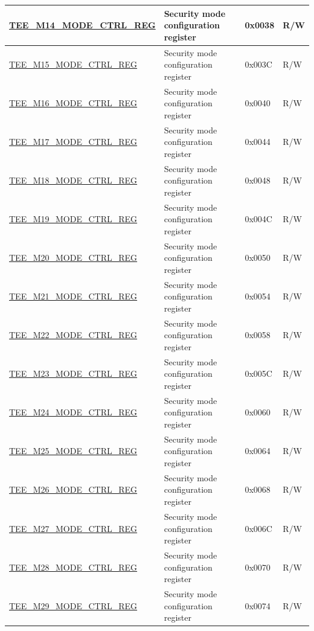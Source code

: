 \begin{longtable}{ | L{6.5cm} | L{6cm} | l | l | }
\hyperref[regdesc:TEEMNMODECTRLREG]{TEE\_M14\_MODE\_CTRL\_REG} & Security mode configuration register & 0x0038 & R/W \\ \hline
\hyperref[regdesc:TEEMNMODECTRLREG]{TEE\_M15\_MODE\_CTRL\_REG} & Security mode configuration register & 0x003C & R/W \\ \hline
\hyperref[regdesc:TEEMNMODECTRLREG]{TEE\_M16\_MODE\_CTRL\_REG} & Security mode configuration register & 0x0040 & R/W \\ \hline
\hyperref[regdesc:TEEMNMODECTRLREG]{TEE\_M17\_MODE\_CTRL\_REG} & Security mode configuration register & 0x0044 & R/W \\ \hline
\hyperref[regdesc:TEEMNMODECTRLREG]{TEE\_M18\_MODE\_CTRL\_REG} & Security mode configuration register & 0x0048 & R/W \\ \hline
\hyperref[regdesc:TEEMNMODECTRLREG]{TEE\_M19\_MODE\_CTRL\_REG} & Security mode configuration register & 0x004C & R/W \\ \hline
\hyperref[regdesc:TEEMNMODECTRLREG]{TEE\_M20\_MODE\_CTRL\_REG} & Security mode configuration register & 0x0050 & R/W \\ \hline
\hyperref[regdesc:TEEMNMODECTRLREG]{TEE\_M21\_MODE\_CTRL\_REG} & Security mode configuration register & 0x0054 & R/W \\ \hline
\hyperref[regdesc:TEEMNMODECTRLREG]{TEE\_M22\_MODE\_CTRL\_REG} & Security mode configuration register & 0x0058 & R/W \\ \hline
\hyperref[regdesc:TEEMNMODECTRLREG]{TEE\_M23\_MODE\_CTRL\_REG} & Security mode configuration register & 0x005C & R/W \\ \hline
\hyperref[regdesc:TEEMNMODECTRLREG]{TEE\_M24\_MODE\_CTRL\_REG} & Security mode configuration register & 0x0060 & R/W \\ \hline
\hyperref[regdesc:TEEMNMODECTRLREG]{TEE\_M25\_MODE\_CTRL\_REG} & Security mode configuration register & 0x0064 & R/W \\ \hline
\hyperref[regdesc:TEEMNMODECTRLREG]{TEE\_M26\_MODE\_CTRL\_REG} & Security mode configuration register & 0x0068 & R/W \\ \hline
\hyperref[regdesc:TEEMNMODECTRLREG]{TEE\_M27\_MODE\_CTRL\_REG} & Security mode configuration register & 0x006C & R/W \\ \hline
\hyperref[regdesc:TEEMNMODECTRLREG]{TEE\_M28\_MODE\_CTRL\_REG} & Security mode configuration register & 0x0070 & R/W \\ \hline
\hyperref[regdesc:TEEMNMODECTRLREG]{TEE\_M29\_MODE\_CTRL\_REG} & Security mode configuration register & 0x0074 & R/W \\ \hline

\end{longtable}
